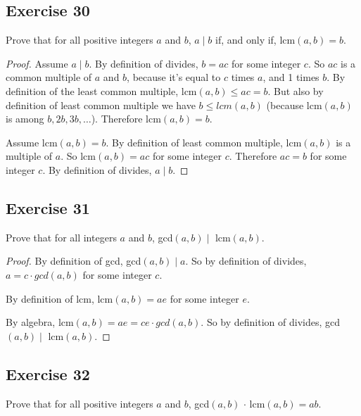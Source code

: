 \documentclass[14pt]{extarticle}
\begin{document}
\subsection{Exercise 30}
Prove that for all positive integers $a$ and $b$, $a \mid b$ if, and only if, lcm$(a, b) = b$.

\begin{proof}
    Assume $a \mid b$. By definition of divides, $b = ac$ for some integer $c$. So $ac$ is a common multiple of $a$ and $b$, because it's equal to $c$ times $a$, and 1 times $b$. By definition of the least common multiple, lcm$(a,b) \leq ac = b$. But also by definition of least common multiple we have $b \leq lcm(a,b)$ (because lcm$(a,b)$ is among $b, 2b, 3b, \ldots$). Therefore lcm$(a,b) = b$.

    Assume lcm$(a, b) = b$. By definition of least common multiple, lcm$(a, b)$ is a multiple of $a$. So lcm$(a, b) = ac$ for some integer $c$. Therefore $ac = b$ for some integer $c$. By definition of divides, $a \mid b$.
\end{proof}

\subsection{Exercise 31}
Prove that for all integers $a$ and $b$, gcd$(a, b) \mid$ lcm$(a, b).$

\begin{proof}
    By definition of gcd, gcd$(a, b) \mid a$. So by definition of divides, $a = c \cdot gcd(a, b)$ for some integer $c$.

    By definition of lcm, lcm$(a, b) = ae$ for some integer $e$.

    By algebra, lcm$(a, b) = ae = ce \cdot gcd(a,b)$. So by definition of divides, gcd$(a, b) \mid$ lcm$(a, b).$
\end{proof}

\subsection{Exercise 32}
Prove that for all positive integers $a$ and $b$, gcd$(a, b)$ $\cdot$ lcm$(a, b) = ab$.
\end{document}
